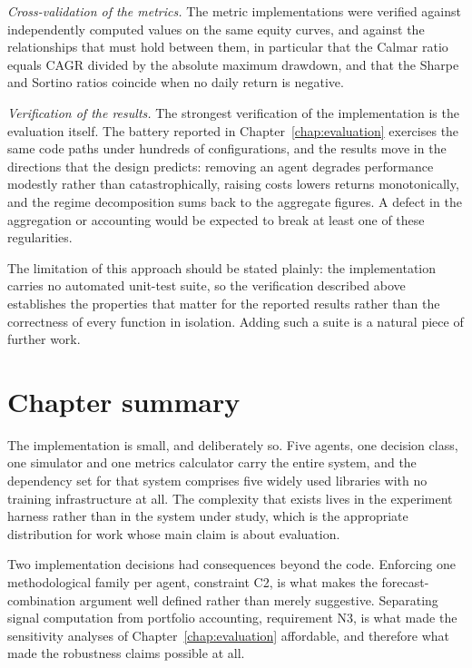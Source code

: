 \emph{Cross-validation of the metrics.} The metric implementations were verified against independently computed values on the same equity curves, and against the relationships that must hold between them, in particular that the Calmar ratio equals CAGR divided by the absolute maximum drawdown, and that the Sharpe and Sortino ratios coincide when no daily return is negative.

\emph{Verification of the results.} The strongest verification of the implementation is the evaluation itself. The battery reported in Chapter~\ref{chap:evaluation} exercises the same code paths under hundreds of configurations, and the results move in the directions that the design predicts: removing an agent degrades performance modestly rather than catastrophically, raising costs lowers returns monotonically, and the regime decomposition sums back to the aggregate figures. A defect in the aggregation or accounting would be expected to break at least one of these regularities.

The limitation of this approach should be stated plainly: the implementation carries no automated unit-test suite, so the verification described above establishes the properties that matter for the reported results rather than the correctness of every function in isolation. Adding such a suite is a natural piece of further work.

\section{Chapter summary}\label{sec:implementation_summary}

The implementation is small, and deliberately so. Five agents, one decision class, one simulator and one metrics calculator carry the entire system, and the dependency set for that system comprises five widely used libraries with no training infrastructure at all. The complexity that exists lives in the experiment harness rather than in the system under study, which is the appropriate distribution for work whose main claim is about evaluation.

Two implementation decisions had consequences beyond the code. Enforcing one methodological family per agent, constraint C2, is what makes the forecast-combination argument well defined rather than merely suggestive. Separating signal computation from portfolio accounting, requirement N3, is what made the sensitivity analyses of Chapter~\ref{chap:evaluation} affordable, and therefore what made the robustness claims possible at all.
